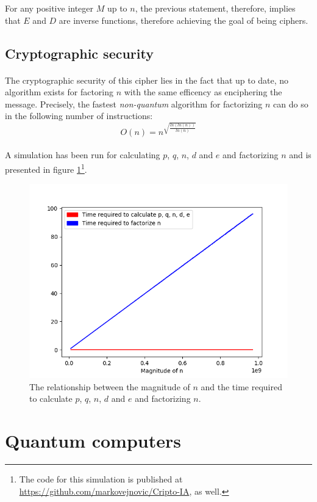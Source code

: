 \documentclass[a4paper, 10pt]{article}
\begin{document}
For any positive integer $M$ up to $n$, the previous statement, therefore, implies that $E$ and $D$ are inverse 
functions, therefore achieving the goal of being ciphers.

\subsection{Cryptographic security}
\paragraph*{}
The cryptographic security of this cipher lies in the fact that up to date, no algorithm exists for factoring $n$ with 
the same efficency as enciphering the message. Precisely, the fastest \textit{non-quantum} algorithm for factorizing 
$n$ can do so in the following number of instructions:
$$O(n) = n^{\sqrt{\frac{ln(ln(n))}{ln(n)}}}$$

\paragraph*{}
A simulation has been run for calculating $p$, $q$, $n$, $d$ and $e$ and factorizing $n$ and is presented in figure
 \ref{fig:rsa_sim}\footnote{The code for this simulation is published at 
\url{https://github.com/markovejnovic/Cripto-IA}, as well.}.
\begin{figure}[ht]
\includegraphics[width=12cm]{rsa_sim}
\centering
\caption{The relationship between the magnitude of $n$ and the time required to calculate $p$, $q$, $n$, $d$ and $e$ 
and factorizing $n$.}
\label{fig:rsa_sim}
\end{figure}

\section{Quantum computers} \label{quantum-comps}
\end{document}
